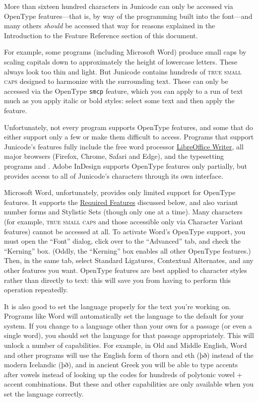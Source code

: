 \documentclass[12pt,letterpaper,openany]{book}
\newcommand\textSourceText[1]{{\color{GGOrange}\texttt{#1}}}
\newcommand{\eng}{\addfontfeature{Language=English}}
\newcommand{\icel}{\addfontfeature{Language=Icelandic}}
\newcounter{Feature}
\begin{document}
More than sixteen hundred characters in Junicode can only be accessed via OpenType features—that is,
by way of the programming built into the font—and many others \textit{should} be
accessed that way for reasons explained in the Introduction
to the Feature Reference section of this document.

For example, some programs (including Microsoft Word) produce small caps by
scaling capitals down to approximately the height of lowercase letters.
These always look too thin and light.
But Junicode contains hundreds of \textsc{true small caps} designed to harmonize with
the surrounding text. These can only be accessed via the OpenType \textSourceText{smcp} feature,
which you can apply to a run of text much as you apply italic or bold styles:
select some text and then apply the feature.

Unfortunately, not every program supports OpenType features, and some that do
either support only a few or make them difficult to access. Programs
that support Junicode’s features fully include the free word processor
\href{https://www.libreoffice.org/}{LibreOffice Writer}, all major browsers
(Firefox, Chrome, Safari and Edge), and
the typesetting programs {\LuaLaTeX} and {\XeLaTeX}. Adobe InDesign supports
OpenType features only partially, but provides access to all of Junicode's characters
through its own interface.

Microsoft Word, unfortunately, provides only limited support for OpenType
features. It supports the \hyperlink{req}{Required Features} discussed below, and also
variant number forms and Stylistic Sets (though only one at a time). Many characters
(for example, \textsc{true small caps} and those accessible only via Character
Variant features) cannot be accessed at all. To activate Word's OpenType
support, you must open the “Font” dialog, click over to the “Advanced” tab,
and check the “Kerning” box. (Oddly, the “Kerning” box enables all other
OpenType features.) Then, in the same tab, select Standard Ligatures, Contextual
Alternates, and any other features you want.
OpenType features are best applied to character styles rather than
directly to text: this will
save you from having to perform this operation repeatedly.

It is also good to set the language properly for the text you're working on.
Programs like Word will automatically set the language to the default for your system. If you
change to a language other than your own for a passage (or even a single word),
you should set the language for that passage appropriately. This will unlock
a number of capabilities. For example, in Old and Middle English, Word and
other programs will use the English form of thorn and eth ({\eng þð}) instead of
the modern Icelandic ({\icel þð}), and in ancient
Greek you will be able to type accents after vowels instead of looking up
the codes for hundreds of polytonic vowel + accent combinations. But these and other capabilities
are only available when you set the language correctly.
\end{document}
